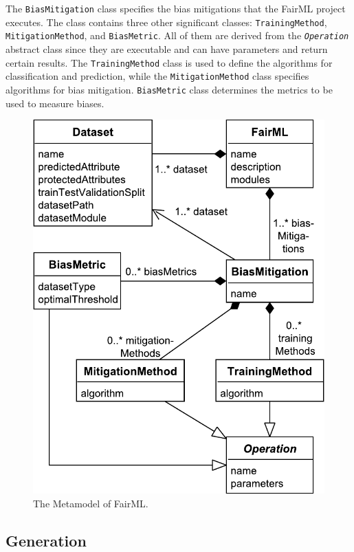 \documentclass[sigconf,review]{acmart}
\begin{document}
The \texttt{BiasMitigation} class specifies the bias mitigations that the FairML project executes. The class contains three other significant classes: \texttt{TrainingMethod}, \texttt{MitigationMethod}, and \texttt{BiasMetric}. All of them are derived from the \texttt{\textit{Operation}} abstract class since they are executable and can have parameters and return certain results. The \texttt{TrainingMethod} class is used to define the algorithms for classification and prediction, while the \texttt{MitigationMethod} class specifies algorithms for bias mitigation. \texttt{BiasMetric} class determines the metrics to be used to measure biases. 

\begin{figure}
	\includegraphics[width=\linewidth]{figures/metamodel}
	\caption{The Metamodel of FairML.}
	\label{fig:metamodel}
\end{figure}

\subsection{Generation}
\label{sec:generation}
\end{document}
